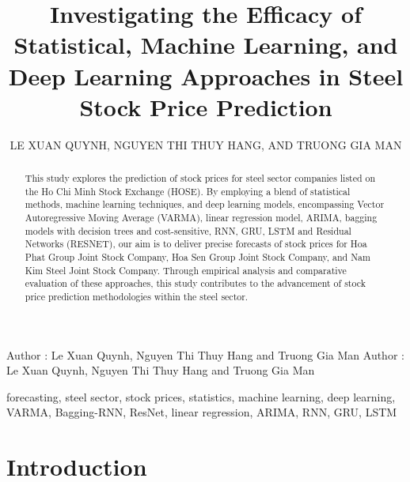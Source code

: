 \documentclass{ieeeojies}
\begin{document}
\title{Investigating the Efficacy of Statistical, Machine Learning, and Deep Learning Approaches in Steel Stock Price Prediction}

\author{\uppercase{Le Xuan Quynh},
\uppercase{Nguyen Thi Thuy Hang, and Truong Gia Man}}

\address[1]{Faculty of Information Systems, University of Information Technology, (e-mail: 21520430@gm.uit.edu.vn)}
\address[2]{Faculty of Information Systems, University of Information Technology, (e-mail: 21520822@gm.uit.edu.vn)}
\address[3]{Faculty of Information Systems, University of Information Technology, (e-mail: 21521115@gm.uit.edu.vn)}

\markboth
{Author \headeretal: Le Xuan Quynh, Nguyen Thi Thuy Hang and Truong Gia Man}
{Author \headeretal: Le Xuan Quynh, Nguyen Thi Thuy Hang and Truong Gia Man}

\begin{abstract}
This study explores the prediction of stock prices for steel sector companies listed on the Ho Chi Minh Stock Exchange (HOSE). By employing a blend of statistical methods, machine learning techniques, and deep learning models, encompassing Vector Autoregressive Moving Average (VARMA), linear regression model, ARIMA, bagging models with decision trees and cost-sensitive, RNN, GRU, LSTM and Residual Networks (RESNET), our aim is to deliver precise forecasts of stock prices for Hoa Phat Group Joint Stock Company, Hoa Sen Group Joint Stock Company, and Nam Kim Steel Joint Stock Company. Through empirical analysis and comparative evaluation of these approaches, this study contributes to the advancement of stock price prediction methodologies within the steel sector.
\end{abstract}

\begin{keywords}
forecasting, steel sector, stock prices, statistics, machine learning, deep learning, VARMA, Bagging-RNN, ResNet, linear regression, ARIMA, RNN, GRU, LSTM
\end{keywords}

\titlepgskip=-15pt

\maketitle

\section{Introduction}
\label{sec:introduction}
\end{document}
